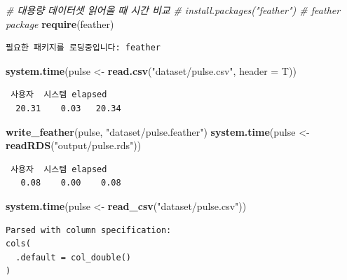 \documentclass[
  11pt,
]{krantz}
\newenvironment{Shaded}{\begin{snugshade}}{\end{snugshade}}
\newcommand{\CommentTok}[1]{\textcolor[rgb]{0.37,0.37,0.37}{\textit{#1}}}
\newcommand{\DataTypeTok}[1]{\textcolor[rgb]{0.27,0.27,0.27}{#1}}
\newcommand{\KeywordTok}[1]{\textcolor[rgb]{0.27,0.27,0.27}{\textbf{#1}}}
\newcommand{\NormalTok}[1]{#1}
\newcommand{\StringTok}[1]{\textcolor[rgb]{0.5,0.5,0.5}{#1}}
\begin{document}
\begin{Shaded}
\begin{Highlighting}[]
\CommentTok{# 대용량 데이터셋 읽어올 때 시간 비교}
\CommentTok{# install.packages("feather") # feather package}
\KeywordTok{require}\NormalTok{(feather)}
\end{Highlighting}
\end{Shaded}

\begin{verbatim}
필요한 패키지를 로딩중입니다: feather
\end{verbatim}

\begin{Shaded}
\begin{Highlighting}[]
\KeywordTok{system.time}\NormalTok{(pulse <-}\StringTok{ }\KeywordTok{read.csv}\NormalTok{(}\StringTok{"dataset/pulse.csv"}\NormalTok{, }\DataTypeTok{header =}\NormalTok{ T))}
\end{Highlighting}
\end{Shaded}

\begin{verbatim}
 사용자  시스템 elapsed 
  20.31    0.03   20.34 
\end{verbatim}

\begin{Shaded}
\begin{Highlighting}[]
\KeywordTok{write_feather}\NormalTok{(pulse, }\StringTok{"dataset/pulse.feather"}\NormalTok{)}
\KeywordTok{system.time}\NormalTok{(pulse <-}\StringTok{ }\KeywordTok{readRDS}\NormalTok{(}\StringTok{"output/pulse.rds"}\NormalTok{))}
\end{Highlighting}
\end{Shaded}

\begin{verbatim}
 사용자  시스템 elapsed 
   0.08    0.00    0.08 
\end{verbatim}

\begin{Shaded}
\begin{Highlighting}[]
\KeywordTok{system.time}\NormalTok{(pulse <-}\StringTok{ }\KeywordTok{read_csv}\NormalTok{(}\StringTok{"dataset/pulse.csv"}\NormalTok{))}
\end{Highlighting}
\end{Shaded}

\begin{verbatim}
Parsed with column specification:
cols(
  .default = col_double()
)
\end{verbatim}
\end{document}
